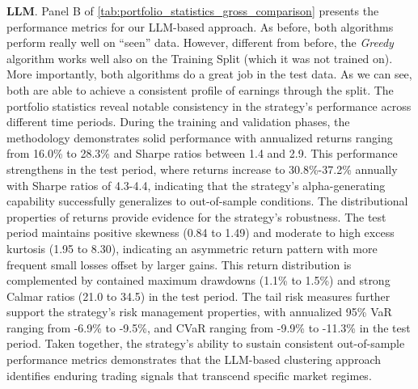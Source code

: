 



\mx
\textbf{LLM}. 
Panel B of \cref{tab:portfolio_statistics_gross_comparison} presents the performance metrics for our LLM-based approach.
As before, both algorithms perform really well on ``seen'' data. However, different from before, the \textit{Greedy} algorithm works well also on the Training Split (which it was not trained on). More importantly, both algorithms do a great job in the test data. As we can see, both are able to achieve a consistent profile of earnings through the split. 
%
The portfolio statistics 
reveal notable consistency in the strategy's performance across different time periods. During the training and validation phases, the methodology demonstrates solid performance with annualized returns ranging from 16.0\% to 28.3\% and Sharpe ratios between 1.4 and 2.9. This performance strengthens in the test period, where returns increase to 30.8\%-37.2\% annually with Sharpe ratios of 4.3-4.4, indicating that the strategy's alpha-generating capability successfully generalizes to out-of-sample conditions. The distributional properties of returns provide evidence for the strategy's robustness. 
%
The test period maintains positive skewness (0.84 to 1.49) and moderate to high excess kurtosis (1.95 to 8.30), indicating an asymmetric return pattern with more frequent small losses offset by larger gains. This return distribution is complemented by contained maximum drawdowns (1.1\% to 1.5\%) and strong Calmar ratios (21.0 to 34.5) in the test period. The tail risk measures further support the strategy's risk management properties, with annualized 95\% VaR ranging from -6.9\% to -9.5\%, and CVaR ranging from -9.9\% to -11.3\% in the test period. 
%
Taken together, the strategy's ability to sustain consistent out-of-sample performance metrics demonstrates that the LLM-based clustering approach identifies enduring trading signals that transcend specific market regimes.


